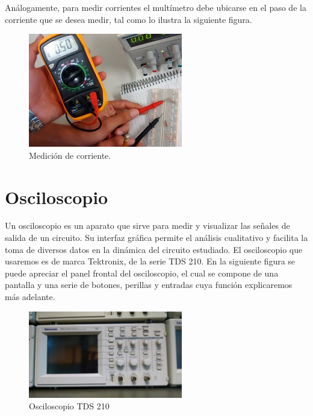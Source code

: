 \documentclass[12pt]{article}
\begin{document}
Análogamente, para medir corrientes el multímetro debe ubicarse en el paso de la corriente que se desea medir, tal como lo ilustra la siguiente figura.
\\ 

\begin{figure}[h!]
	\centering
	\includegraphics[width=0.6\textwidth,height=0.25\textheight]{corriente}
	\caption{Medición de corriente.}
\end{figure}

\section{Osciloscopio}
Un osciloscopio es un aparato que sirve para medir y visualizar las señales de salida de un circuito. Su interfaz gráfica permite el análisis cualitativo y facilita la toma de diversos datos en la dinámica del circuito estudiado. El osciloscopio que usaremos es de marca Tektronix, de la serie TDS 210. En la siguiente figura se puede apreciar el panel frontal del osciloscopio, el cual se compone de una pantalla y una serie de botones, perillas y entradas cuya función explicaremos más adelante.\\

\begin{figure}[h!]
	\centering
	\includegraphics[width=0.6\textwidth,height=0.25\textheight]{osciloscopio.jpg}
	\caption{Osciloscopio TDS 210}
\end{figure}
\end{document}
